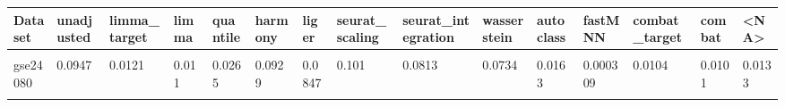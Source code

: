 \centering
\begin{tabular}{l|l|l|l|l|l|l|l|l|l|l|l|l|l|l}
\hline
Dataset & unadjusted & limma\_target & limma & quantile & harmony & liger & seurat\_scaling & seurat\_integration & wasserstein & autoclass & fastMNN & combat\_target & combat & <NA>\\
\hline
\cellcolor{gray!10}{gse20194} & \cellcolor{gray!10}{0.138} & \cellcolor{gray!10}{0.0272} & \cellcolor{gray!10}{0.0155} & \cellcolor{gray!10}{0.0535} & \cellcolor{gray!10}{0.137} & \cellcolor{gray!10}{0.126} & \cellcolor{gray!10}{0.141} & \cellcolor{gray!10}{0.11} & \cellcolor{gray!10}{0.126} & \cellcolor{gray!10}{0.0582} & \cellcolor{gray!10}{0.000856} & \cellcolor{gray!10}{0.0298} & \cellcolor{gray!10}{0.0197} & \cellcolor{gray!10}{0.0192}\\
\hline
gse24080 & 0.0947 & 0.0121 & 0.011 & 0.0265 & 0.0929 & 0.0847 & 0.101 & 0.0813 & 0.0734 & 0.0163 & 0.000309 & 0.0104 & 0.0101 & 0.0133\\
\hline
\cellcolor{gray!10}{gse49711} & \cellcolor{gray!10}{0.137} & \cellcolor{gray!10}{0.134} & \cellcolor{gray!10}{0.132} & \cellcolor{gray!10}{0.193} & \cellcolor{gray!10}{0.306} & \cellcolor{gray!10}{0.0883} & \cellcolor{gray!10}{0.224} & \cellcolor{gray!10}{0.135} & \cellcolor{gray!10}{0.129} & \cellcolor{gray!10}{0.183} & \cellcolor{gray!10}{8.79e-05} & \cellcolor{gray!10}{0.136} & \cellcolor{gray!10}{0.135} & \cellcolor{gray!10}{0.13}\\
\hline
\end{tabular}